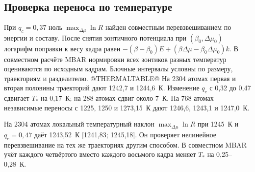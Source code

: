 \subsection*{Проверка переноса по температуре}
При \(q_c=0{,}37\) ноль \(\max_{\Delta\mu}\ln R\) найден совместным перевзвешиванием по энергии и составу. После снятия зонтичного потенциала при \((\beta_0,\Delta\mu_0)\) логарифм поправки к весу кадра равен \(-(\beta-\beta_0)E+(\beta\Delta\mu-\beta_0\Delta\mu_0)k\). В совместном расчёте MBAR нормировки всех зонтиков разных температур оцениваются по исходным кадрам. Блочные интервалы условны по размеру, траекториям и разделителю.
@THERMALTABLE@
На 2304 атомах первая и вторая половины траекторий дают 1242,7 и 1244,6~К. Изменение \(q_c\) с 0,32 до 0,47 сдвигает \(T_*\) на 0,17~К; на 288 атомах сдвиг около 7~К. На 768 атомах независимые переносы с 1225, 1250 и 1273,15~К дают 1246,6, 1243,1 и 1247,0~К.

На 2304 атомах локальный температурный наклон \(\max_{\Delta\mu}\ln R\) при 1245~К и \(q_c=0{,}47\) даёт 1243,52~К [1241,83; 1245,18]. Он проверяет нелинейное перевзвешивание на тех же траекториях другим способом. В совместном MBAR учёт каждого четвёртого вместо каждого восьмого кадра меняет \(T_*\) на 0,25--0,28~К.
